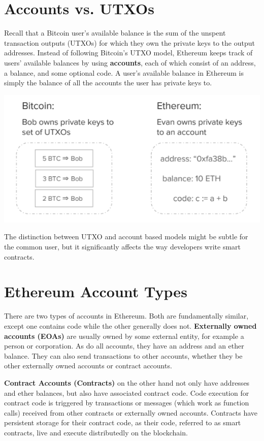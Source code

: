 \documentclass[full.tex]{subfiles}
\begin{document}
    \section*{Accounts vs. UTXOs}
    
    Recall that a Bitcoin user's available balance is the sum of the unspent transaction outputs (UTXOs) for which they own the private keys to the output addresses. Instead of following Bitcoin's UTXO model, Ethereum keeps track of users' available balances by using \textbf{accounts}, each of which consist of an address, a balance, and some optional code. A user's available balance in Ethereum is simply the balance of all the accounts the user has private keys to. 
    
    \begin{center}
    \includegraphics[scale=0.5]{utxo_account}
    \end{center}
    
    The distinction between UTXO and account based models might be subtle for the common user, but it significantly affects the way developers write smart contracts. 
    
    \section*{Ethereum Account Types}
    
    There are two types of accounts in Ethereum. Both are fundamentally similar, except one contains code while the other generally does not. \textbf{Externally owned accounts (EOAs)} are usually owned by some external entity, for example a person or corporation. As do all accounts, they have an address and an ether balance. They can also send transactions to other accounts, whether they be other externally owned accounts or contract accounts.
    
    \textbf{Contract Accounts (Contracts)} on the other hand not only have addresses and ether balances, but also have associated contract code. Code execution for contract code is triggered by transactions or messages (which work as function calls) received from other contracts or externally owned accounts. Contracts have persistent storage for their contract code, as their code, referred to as smart contracts, live and execute distributedly on the blockchain.
    
\end{document}
